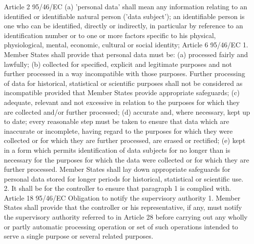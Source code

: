 Article 2 95/46/EC
(a) 'personal data' shall mean any information relating to an identified or identifiable natural person ('data subject'); an identifiable person is one who can be identified, directly or indirectly, in particular by reference to an identification number or to one or more factors specific to his physical, physiological, mental, economic, cultural or social identity;
Article 6 95/46/EC
1. Member States shall provide that personal data must be:
(a) processed fairly and lawfully;
(b) collected for specified, explicit and legitimate purposes and not further processed in a way incompatible with those purposes. Further processing of data for historical, statistical or scientific purposes shall not be considered as incompatible provided that Member States provide appropriate safeguards;
(c) adequate, relevant and not excessive in relation to the purposes for which they are collected and/or further processed;
(d) accurate and, where necessary, kept up to date; every reasonable step must be taken to ensure that data which are inaccurate or incomplete, having regard to the purposes for which they were collected or for which they are further processed, are erased or rectified;
(e) kept in a form which permits identification of data subjects for no longer than is necessary for the purposes for which the data were collected or for which they are further processed. Member States shall lay down appropriate safeguards for personal data stored for longer periods for historical, statistical or scientific use.
2. It shall be for the controller to ensure that paragraph 1 is complied with.
Article 18 95/46/EC
Obligation to notify the supervisory authority
1. Member States shall provide that the controller or his representative, if any, must notify the supervisory authority referred to in Article 28 before carrying out any wholly or partly automatic processing operation or set of such operations intended to serve a single purpose or several related purposes.
